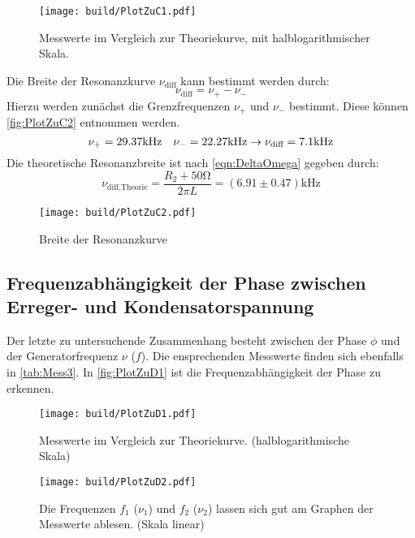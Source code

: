 \begin{figure}
  \centering
  \texttt{[image: build/PlotZuC1.pdf]}
  \caption{Messwerte im Vergleich zur Theoriekurve, mit halblogarithmischer Skala.}
  \label{fig:PlotZuC1}
\end{figure}

Die Breite der Resonanzkurve $\nu_{\text{diff}}$ kann bestimmt werden durch:
\begin{equation}
  \nu_{\text{diff}} = \nu_+ - \nu_-
\end{equation}
Hierzu werden zunächst die Grenzfrequenzen $\nu_+$ und $\nu_-$ bestimmt. Diese können \autoref{fig:PlotZuC2} entnommen werden.
\begin{equation}
  \nu_+ = 29.37\unit{\kilo\hertz} \,\,\,\,\,\, \nu_- = 22.27\unit{\kilo\hertz} \\
  \rightarrow \nu_{\text{diff}} = 7.1 \unit{\kilo\hertz}
\end{equation}
Die theoretische Resonanzbreite ist nach \eqref{eqn:DeltaOmega} gegeben durch:
\begin{equation}
  \nu_{\text{diff,Theorie}} = \frac{R_2 +50\unit{\ohm}}{2\pi L} = \left(6.91 \pm 0.47\right)\unit{\kilo\hertz}
\end{equation}

\begin{figure}
  \centering
  \texttt{[image: build/PlotZuC2.pdf]}
  \caption{Breite der Resonanzkurve}
  \label{fig:PlotZuC2}
\end{figure}

\subsection{Frequenzabhängigkeit der Phase zwischen Erreger- und Kondensatorspannung}
\label{subsec:AuswertungD}

Der letzte zu untersuchende Zusammenhang besteht zwischen der Phase $\phi$ und der Generatorfrequenz $\nu$ ($f$). Die ensprechenden Messwerte finden sich
ebenfalls in \autoref{tab:Mess3}. In \autoref{fig:PlotZuD1} ist die Frequenzabhängigkeit der Phase zu erkennen.

\begin{figure}
  \centering
  \texttt{[image: build/PlotZuD1.pdf]}
  \caption{Messwerte im Vergleich zur Theoriekurve. (halblogarithmische Skala)}
  \label{fig:PlotZuD1}
\end{figure}

\begin{figure}
  \centering
  \texttt{[image: build/PlotZuD2.pdf]}
  \caption{Die Frequenzen $f_1$ ($\nu_1$) und $f_2$ ($\nu_2$) lassen sich gut am Graphen der Messwerte ablesen. (Skala linear)}
  \label{fig:PlotZuD2}
\end{figure}

